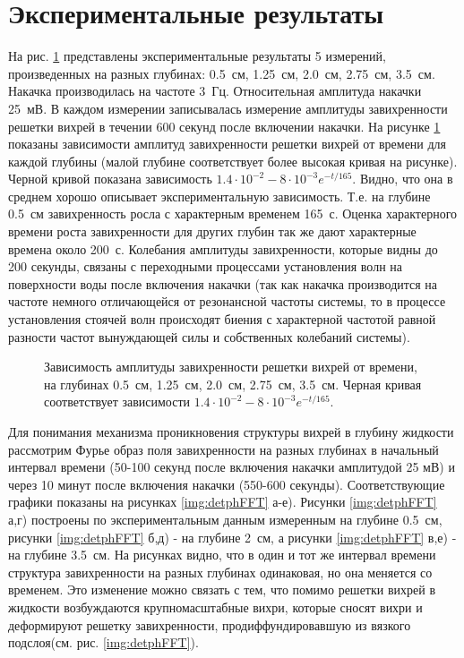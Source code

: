 \section{Экспериментальные результаты} \label{sect6_3}

На рис. \ref{img:5deeps} представлены экспериментальные результаты 5 измерений, произведенных на разных глубинах: 0.5~см, 1.25~см, 2.0~см, 2.75~см, 3.5~см. Накачка производилась на частоте 3~Гц. Относительная амплитуда накачки 25~мВ. В каждом измерении записывалась измерение амплитуды завихренности решетки вихрей в течении 600 секунд после включении накачки. На рисунке \ref{img:5deeps} показаны зависимости амплитуд завихренности решетки вихрей от времени для каждой глубины (малой глубине соответствует более высокая кривая на рисунке). Черной кривой показана зависимость $1.4 \cdot 10^{-2} - 8 \cdot 10^{-3} e^{-t/165}$. Видно, что она в среднем хорошо описывает экспериментальную зависимость. Т.е. на глубине 0.5~см завихренность росла с характерным временем 165~с. Оценка характерного времени роста завихренности для других глубин так же дают характерные времена около 200~с. Колебания амплитуды завихренности, которые видны до 200 секунды, связаны с переходными процессами установления волн на поверхности воды после включения накачки (так как накачка производится на частоте немного отличающейся от резонансной частоты системы, то в процессе установления стоячей волн происходят биения с характерной частотой равной разности частот вынуждающей силы и собственных колебаний системы).

\begin{figure}[ht]
 \caption{Зависимость амплитуды завихренности решетки вихрей от времени, на глубинах 0.5~см, 1.25~см, 2.0~см, 2.75~см, 3.5~см. Черная кривая соответствует зависимости $1.4 \cdot 10^{-2} - 8 \cdot 10^{-3} e^{-t/165}$.}
 \label{img:5deeps} 
\end{figure}

Для понимания механизма проникновения структуры вихрей в глубину жидкости рассмотрим Фурье образ поля завихренности на разных глубинах в начальный интервал времени (50-100 секунд после включения накачки амплитудой 25 мВ) и через 10 минут после включения накачки (550-600 секунды). Соответствующие графики показаны на рисунках \ref{img:detphFFT} а-е). Рисунки \ref{img:detphFFT} а,г) построены по экспериментальным данным измеренным на глубине 0.5~см, рисунки \ref{img:detphFFT} б,д) - на глубине 2~см, а рисунки \ref{img:detphFFT} в,е) - на глубине 3.5~см. На рисунках видно, что в один и тот же интервал времени структура завихренности на разных глубинах одинаковая, но она меняется со временем. Это изменение можно связать с тем, что помимо решетки вихрей в жидкости возбуждаются крупномасштабные вихри, которые сносят вихри и деформируют решетку завихренности, продиффундировавшую из вязкого подслоя(см. рис. \ref{img:detphFFT}).

